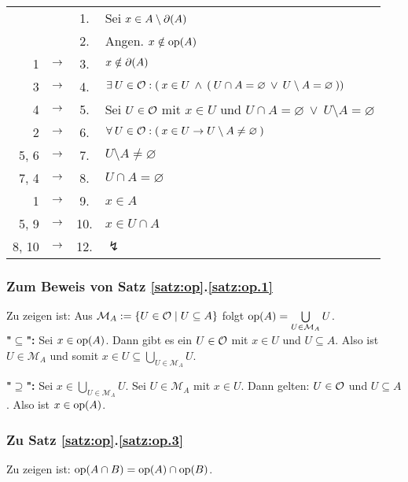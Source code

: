         \begin{longtable}{r c c l}
            & & 1. & Sei $x \in A \setminus \partial(A)$ \\
            & & 2. & Angen. $x \notin \text{op}(A)$ \\
            1 & $\rightarrow$ & 3. & $x \notin \partial(A)$ \\
            3 & $\rightarrow$ & 4. & $\exists\: U \in \mathcal{O} : (\: x \in U \:\land\: (\: U \cap A = \varnothing \:\lor\: U \setminus A = \varnothing \:))$ \\
            4 & $\rightarrow$ & 5. & Sei $U \in \mathcal{O}$ mit $x \in U$ und $U \cap A = \varnothing \:\lor\: U \setminus A = \varnothing$ \\
            2 & $\rightarrow$ & 6. & $\forall\: U \in \mathcal{O} : (\: x \in U \to U \setminus A \neq \varnothing \:)$ \\
            5, 6 & $\rightarrow$ & 7. & $U \setminus A \neq \varnothing$ \\
            7, 4 & $\rightarrow$ & 8. & $U \cap A = \varnothing$ \\
            1 & $\rightarrow$ & 9. & $x \in A$ \\
            5, 9 & $\rightarrow$ & 10. & $x \in U \cap A$ \\	
            8, 10 & $\rightarrow$ & 12. & $\lightning$ 
        \end{longtable}


\subsubsection{Zum Beweis von Satz \ref{satz:op}.\ref{satz:op.1}}\label{anh:op.1}
    Zu zeigen ist: Aus ${\mathcal{M}_A := \{U \in \mathcal{O} \mid U \subseteq A\}}$ folgt $\text{op}(A) = \bigcup\limits_{U \in \mathcal{M}_A} U$.\\

    \noindent
    \textbf{"$\boldsymbol{\subseteq}$":} 
    Sei $x \in \text{op}(A)$. Dann gibt es ein ${U \in \mathcal{O}}$ mit $x \in U$ und ${U \subseteq A}$. Also ist ${U \in \mathcal{M}_A}$ und somit ${x \in U \subseteq \bigcup\limits_{U \in \mathcal{M}_A} U}$.

    \noindent
    \textbf{"$\boldsymbol{\supseteq}$":}
    Sei $x \in \bigcup\limits_{U \in \mathcal{M}_A} U$. Sei $U \in \mathcal{M}_A$ mit $x \in U$. Dann gelten: $U \in \mathcal{O}$ und $U \subseteq A$. Also ist $x \in \text{op}(A)$.


\subsubsection{Zu Satz \ref{satz:op}.\ref{satz:op.3}}\label{anh:op.3}
    Zu zeigen ist: $\text{op}(A \cap B) = \text{op}(A) \cap \text{op}(B)$.\\

